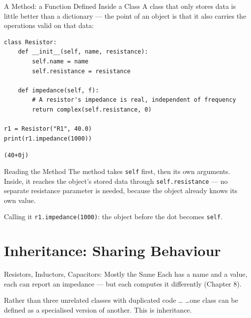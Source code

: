 \documentclass[9pt,aspectratio=169,xcolor=table]{beamer}
\begin{document}
\begin{frame}[fragile]{A Method: a Function Defined Inside a Class}
    \leavevmode
    A class that only stores data is little better than a dictionary ---
    the point of an object is that it also carries the operations valid
    on that data:

\begin{lstlisting}
class Resistor:
    def __init__(self, name, resistance):
        self.name = name
        self.resistance = resistance

    def impedance(self, f):
        # A resistor's impedance is real, independent of frequency
        return complex(self.resistance, 0)

r1 = Resistor("R1", 40.0)
print(r1.impedance(1000))
\end{lstlisting}
    \texttt{(40+0j)}
\end{frame}

\begin{frame}{Reading the Method}
    \leavevmode
    \small
    The method takes \texttt{self} first, then its own arguments. Inside,
    it reaches the object's stored data through
    \texttt{self.resistance} --- no separate resistance parameter is
    needed, because the object already knows its own value.

    \vspace{3mm}
    \begin{block}{Calling it}
        \texttt{r1.impedance(1000)}: the object before the dot becomes
        \texttt{self}.
    \end{block}
\end{frame}

\section{Inheritance: Sharing Behaviour}

\begin{frame}{Resistors, Inductors, Capacitors: Mostly the Same}
    \leavevmode
    Each has a name and a value, each can report an impedance --- but
    each computes it differently (Chapter 8).

    \vspace{2mm}
    \begin{alertblock}{Rather than three unrelated classes with
        duplicated code \ldots}
        \ldots one class can be defined as a specialised version of
        another. This is \alert{inheritance}.
    \end{alertblock}
\end{frame}
\end{document}
